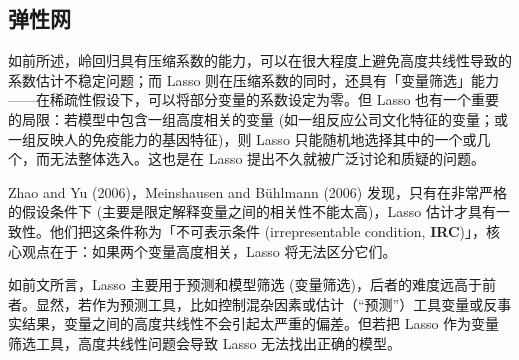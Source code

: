 \subsection{弹性网}\label{sec:lasso-enet}
%



如前所述，岭回归具有压缩系数的能力，可以在很大程度上避免高度共线性导致的系数估计不稳定问题；而 Lasso 则在压缩系数的同时，还具有「变量筛选」能力——在稀疏性假设下，可以将部分变量的系数设定为零。但 Lasso 也有一个重要的局限：若模型中包含一组高度相关的变量 (如一组反应公司文化特征的变量；或一组反映人的免疫能力的基因特征)，则 Lasso 只能随机地选择其中的一个或几个，而无法整体选入。这也是在 Lasso 提出不久就被广泛讨论和质疑的问题。

Zhao and Yu (2006)，Meinshausen and Bühlmann (2006) 发现，只有在非常严格的假设条件下 (主要是限定解释变量之间的相关性不能太高)，Lasso 估计才具有一致性。他们把这条件称为「不可表示条件 (irrepresentable condition, \textbf{IRC})」，核心观点在于：如果两个变量高度相关，Lasso 将无法区分它们。

如前文所言，Lasso 主要用于预测和模型筛选 (变量筛选)，后者的难度远高于前者。显然，若作为预测工具，比如控制混杂因素或估计（“预测”）工具变量或反事实结果，变量之间的高度共线性不会引起太严重的偏差。但若把 Lasso 作为变量筛选工具，高度共线性问题会导致 Lasso 无法找出正确的模型。

